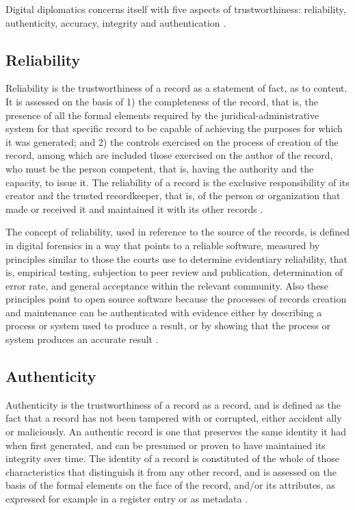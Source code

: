 Digital diplomatics concerns itself with five aspects of trustworthiness: reliability, authenticity, accuracy, integrity and authentication \cite[10]{kirschenbaum2010digital}.

\subsection{Reliability}
Reliability is the trustworthiness of a record as a statement of fact, as to content. It is assessed on the basis of 1) the completeness of the record, that is, the presence of all the formal elements required by the juridical-administrative system for that specific record to be capable of achieving the purposes for which it was generated; and 2) the controls exercised on the process of creation of the record, among which are included those exercised on the author of the record, who must be the person competent, that is, having the authority and the capacity, to issue it. The reliability of a record is the exclusive responsibility of its creator and the trusted recordkeeper, that is, of the person or organization that made or received it and maintained it with its other records \cite[52]{duranti2009digital}.

The concept of reliability, used in reference to the source of the records, is defined in digital forensics in a way that points to a reliable software, measured by principles similar to those the courts use to determine evidentiary reliability, that is, empirical testing, subjection to peer review and publication, determination of error rate, and general acceptance within the relevant community. Also these principles point to open source software because the processes of records creation and maintenance can be authenticated with evidence either by describing a process or system used to produce a result, or by showing that the process or system produces an accurate result \cite[59]{duranti2009digital}.

\subsection{Authenticity}
Authenticity is the trustworthiness of a record as a record, and is defined as the fact that a record has not been tampered with or corrupted, either accident ally or maliciously. An authentic record is one that preserves the same identity it had when first generated, and can be presumed or proven to have maintained its integrity over time. The identity of a record is constituted of the whole of those characteristics that distinguish it from any other record, and is assessed on the basis of the formal elements on the face of the record, and/or its attributes, as expressed for example in a register entry or as metadata \cite[52]{duranti2009digital}.

